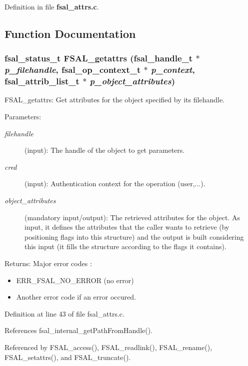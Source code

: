 Definition in file {\bf fsal\_\-attrs.c}.

\subsection{Function Documentation}
\subsubsection{\setlength{\rightskip}{0pt plus 5cm}fsal\_\-status\_\-t FSAL\_\-getattrs (fsal\_\-handle\_\-t $\ast$ {\em p\_\-filehandle}, fsal\_\-op\_\-context\_\-t $\ast$ {\em p\_\-context}, fsal\_\-attrib\_\-list\_\-t $\ast$ {\em p\_\-object\_\-attributes})}\label{fsal__attrs_8c_a0}


FSAL\_\-getattrs: Get attributes for the object specified by its filehandle.

\begin{Desc}
\item[Parameters:]
\begin{description}
\item[{\em filehandle}](input): The handle of the object to get parameters. \item[{\em cred}](input): Authentication context for the operation (user,...). \item[{\em object\_\-attributes}](mandatory input/output): The retrieved attributes for the object. As input, it defines the attributes that the caller wants to retrieve (by positioning flags into this structure) and the output is built considering this input (it fills the structure according to the flags it contains).\end{description}
\end{Desc}
\begin{Desc}
\item[Returns:]Major error codes :\begin{itemize}
\item ERR\_\-FSAL\_\-NO\_\-ERROR (no error)\item Another error code if an error occured. \end{itemize}
\end{Desc}


Definition at line 43 of file fsal\_\-attrs.c.

References fsal\_\-internal\_\-get\-Path\-From\-Handle().

Referenced by FSAL\_\-access(), FSAL\_\-readlink(), FSAL\_\-rename(), FSAL\_\-setattrs(), and FSAL\_\-truncate().
